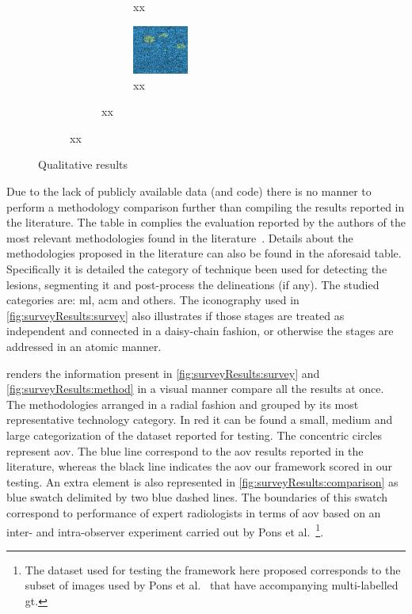 \begin{figure}[h]
\begin{subfigure}[b]{0.55\textwidth}
\begin{subfigure}[b]{0.3\textwidth}
\begin{subfigure}[b]{\textwidth}
          \caption{xx}
          \label{fig:resuts:smallPWterm}
        \end{subfigure}
        \begin{subfigure}[b]{\textwidth}
          \vspace{5pt}
            \includegraphics[trim = 0 90 0 0, clip, height=1.6cm]{fpHom}
            \caption{{\small xx}}
            \label{fig:results:bigPWterm}
        \end{subfigure}
      \end{subfigure}
    \end{subfigure}
  \caption{Qualitative results}
  \label{fig:results}
\end{figure}

Due to the lack of publicly available data (and code) there is no manner to perform a methodology comparison further than compiling the results reported in the literature.
The table in  complies the evaluation reported by the authors of the most relevant methodologies found in the literature~\cite{massich2013phd}.
Details about the methodologies proposed in the literature can also be found in the aforesaid table.
Specifically it is detailed the category of technique been used for detecting the lesions, segmenting it and post-process the delineations (if any).
The studied categories are: \ac{ml}, \ac{acm} and others.
The iconography used in \cref{fig:surveyResults:survey} also illustrates if those stages are treated as independent and connected in a daisy-chain fashion, or otherwise the stages are addressed in an atomic manner.

 renders the information present in \cref{fig:surveyResults:survey} and \cref{fig:surveyResults:method} in a visual manner compare all the results at once.
The methodologies arranged in a radial fashion and grouped by its most representative technology category. 
In red it can be found a small, medium and large categorization of the dataset reported for testing.
The concentric circles represent \ac{aov}. 
The blue line correspond to the \ac{aov} results reported in the literature, whereas the black line indicates the \ac{aov} our framework scored in our testing.
An extra element is also represented in \cref{fig:surveyResults:comparison} as blue swatch delimited by two blue dashed lines.
The boundaries of this swatch correspond to performance of expert radiologists in terms of \ac{aov} based on an inter- and intra-observer experiment carried out by Pons et al.~\cite{gerard2013}\footnote{The dataset used for testing the framework here proposed corresponds to the subset of images used by Pons et al.~\cite{gerard2013} that have accompanying multi-labelled \ac{gt}.}.


